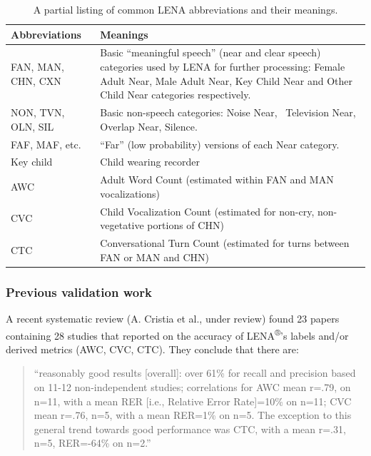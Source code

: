 \documentclass[english,floatsintext,man]{apa6}
\begin{document}
\begin{table}[t]

\caption{\label{tab:tab-abb}A partial listing of common LENA abbreviations and their meanings.}
\centering
\begin{tabular}{>{\raggedright\arraybackslash}p{12em}>{\raggedright\arraybackslash}p{28em}}
\toprule
Abbreviations & Meanings\\
\midrule
FAN, MAN, CHN, CXN & Basic “meaningful speech” (near and clear speech) categories used by LENA for further processing: Female Adult Near, Male Adult Near, Key Child Near and Other Child Near categories respectively.\\
NON, TVN, OLN, SIL & Basic non-speech categories: Noise Near,  Television Near, Overlap Near, Silence.\\
FAF, MAF, etc. & “Far” (low probability) versions of each Near category.\\
Key child & Child wearing recorder\\
AWC & Adult Word Count (estimated within FAN and MAN vocalizations)\\
\addlinespace
CVC & Child Vocalization Count (estimated for non-cry, non-vegetative portions of CHN)\\
CTC & Conversational Turn Count (estimated for turns between FAN or MAN and CHN)\\
\bottomrule
\end{tabular}
\end{table}

\subsubsection{Previous validation work}\label{previous-validation-work}

A recent systematic review (A. Cristia et al., under review) found 23
papers containing 28 studies that reported on the accuracy of
LENA\textsuperscript{®}'s labels and/or derived metrics (AWC, CVC, CTC).
They conclude that there are:

\begin{quote}
\enquote{reasonably good results {[}overall{]}: over 61\% for recall and
precision based on 11-12 non-independent studies; correlations for AWC
mean r=.79, on n=11, with a mean RER {[}i.e., Relative Error
Rate{]}=10\% on n=11; CVC mean r=.76, n=5, with a mean RER=1\% on n=5.
The exception to this general trend towards good performance was CTC,
with a mean r=.31, n=5, RER=-64\% on n=2.}
\end{quote}
\end{document}
